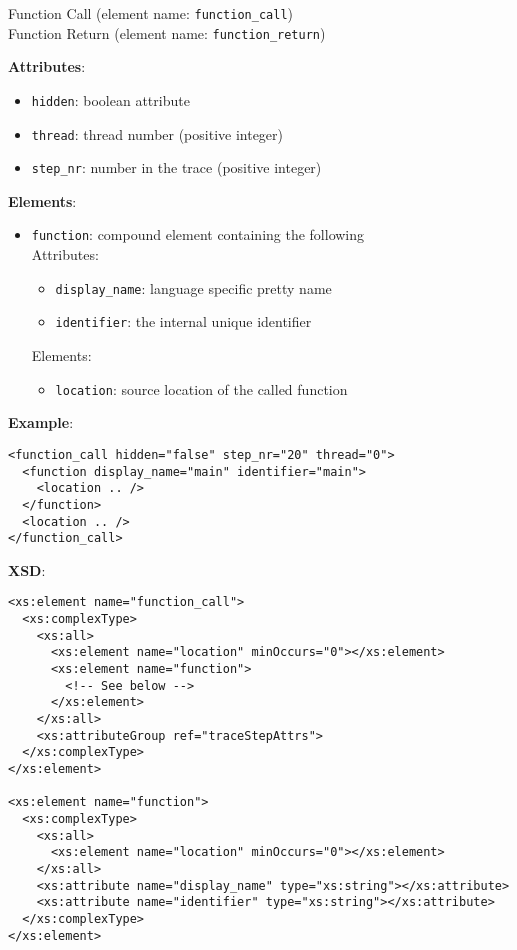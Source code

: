 \documentclass[12pt]{article}
\begin{document}
\hrulefill

\begin{center}
  {\Large Function Call} (element name: \texttt{function\_call})\\
  {\Large Function Return} (element name: \texttt{function\_return})
\end{center}

\noindent\textbf{Attributes}:
\begin{itemize}
\item \texttt{hidden}: boolean attribute
\item \texttt{thread}: thread number (positive integer)
\item \texttt{step\_nr}: number in the trace (positive integer)
\end{itemize}

\noindent\textbf{Elements}:
\begin{itemize}
\item \texttt{function}: compound element containing the following\\
  Attributes:
  \begin{itemize}
  \item \texttt{display\_name}: language specific pretty name
  \item \texttt{identifier}: the internal unique identifier
  \end{itemize}
  Elements:
  \begin{itemize}
  \item \texttt{location}: source location of the called function
  \end{itemize}
\end{itemize}

\noindent\textbf{Example}:
\begin{verbatim}
<function_call hidden="false" step_nr="20" thread="0">
  <function display_name="main" identifier="main">
    <location .. />
  </function>
  <location .. />
</function_call>
\end{verbatim}

\noindent\textbf{XSD}:
\begin{verbatim}
<xs:element name="function_call">
  <xs:complexType>
    <xs:all>
      <xs:element name="location" minOccurs="0"></xs:element>
      <xs:element name="function">
        <!-- See below -->
      </xs:element>
    </xs:all>
    <xs:attributeGroup ref="traceStepAttrs">
  </xs:complexType>
</xs:element>

<xs:element name="function">
  <xs:complexType>
    <xs:all>
      <xs:element name="location" minOccurs="0"></xs:element>
    </xs:all>
    <xs:attribute name="display_name" type="xs:string"></xs:attribute>
    <xs:attribute name="identifier" type="xs:string"></xs:attribute>
  </xs:complexType>
</xs:element>
\end{verbatim}
\end{document}

